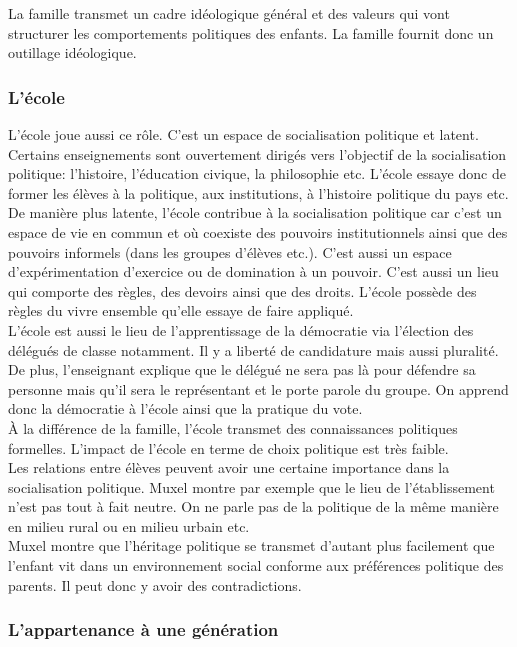 \documentclass[12pt, a4paper, openany]{book}
\begin{document}
La famille transmet un cadre idéologique général et des valeurs qui vont structurer les comportements politiques des enfants. La famille fournit donc un outillage idéologique.

\subsubsection{L'école}

L'école joue aussi ce rôle. C'est un espace de socialisation politique et latent. \\
Certains enseignements sont ouvertement dirigés vers l'objectif de la socialisation politique: l'histoire, l'éducation civique, la philosophie etc. L'école essaye donc de former les élèves à la politique, aux institutions, à l'histoire politique du pays etc. \\
De manière plus latente, l'école contribue à la socialisation politique car c'est un espace de vie en commun et où coexiste des pouvoirs institutionnels ainsi que des pouvoirs informels (dans les groupes d'élèves etc.). C'est aussi un espace d'expérimentation d'exercice ou de domination à un pouvoir. C'est aussi un lieu qui comporte des règles, des devoirs ainsi que des droits. L'école possède des règles du vivre ensemble qu'elle essaye de faire appliqué. \\
L'école est aussi le lieu de l'apprentissage de la démocratie via l'élection des délégués de classe notamment. Il y a liberté de candidature mais aussi pluralité. De plus, l'enseignant explique que le délégué ne sera pas là pour défendre sa personne mais qu'il sera le représentant et le porte parole du groupe. On apprend donc la démocratie à l'école ainsi que la pratique du vote. \\
À la différence de la famille, l'école transmet des connaissances politiques formelles. L'impact de l'école en terme de choix politique est très faible. \\
Les relations entre élèves peuvent avoir une certaine importance dans la socialisation politique. Muxel montre par exemple que le lieu de l'établissement n'est pas tout à fait neutre. On ne parle pas de la politique de la même manière en milieu rural ou en milieu urbain etc. \\
Muxel montre que l'héritage politique se transmet d'autant plus facilement que l'enfant vit dans un environnement social conforme aux préférences politique des parents. Il peut donc y avoir des contradictions.

\subsubsection{L'appartenance à une génération}
\end{document}
